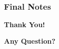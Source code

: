 \documentclass[compress,oilve]{beamer}
\begin{document}
\frametitle{Final Notes}
\centering
\vspace{50 pt}
\textbf{Thank You!}
\vspace{50pt}

\textbf{Any Question?}
\end{document}
